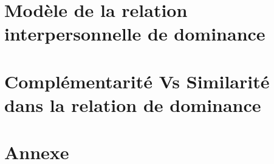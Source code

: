 \documentclass[a4paper, 11pt]{book}
\begin{document}
	
%	
%	
%	
%	
	\chapter{Modèle de la relation interpersonnelle de dominance}
	\minitoc
	

\chapter{Complémentarité Vs Similarité dans la relation de dominance}
%
%	

			
	\chapter{Annexe}
%
		
			\label{chap:Annexe}

	
	
\end{document}

